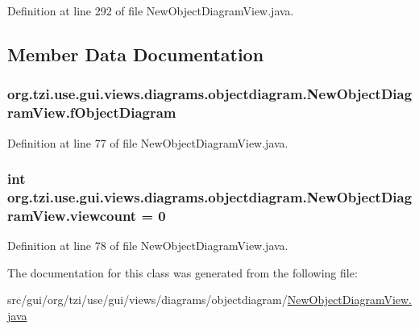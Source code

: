 Definition at line 292 of file New\-Object\-Diagram\-View.\-java.



\subsection{Member Data Documentation}
\hypertarget{classorg_1_1tzi_1_1use_1_1gui_1_1views_1_1diagrams_1_1objectdiagram_1_1_new_object_diagram_view_ad7a1ba78a6a7ca88f1766a8d6df07f90}{
\subsubsection[{f\-Object\-Diagram}]{ org.\-tzi.\-use.\-gui.\-views.\-diagrams.\-objectdiagram.\-New\-Object\-Diagram\-View.\-f\-Object\-Diagram\hspace{0.3cm}{\ttfamily [protected]}}}\label{classorg_1_1tzi_1_1use_1_1gui_1_1views_1_1diagrams_1_1objectdiagram_1_1_new_object_diagram_view_ad7a1ba78a6a7ca88f1766a8d6df07f90}


Definition at line 77 of file New\-Object\-Diagram\-View.\-java.

\hypertarget{classorg_1_1tzi_1_1use_1_1gui_1_1views_1_1diagrams_1_1objectdiagram_1_1_new_object_diagram_view_a11a470c191107c665d2382ba26a9cbb1}{
\subsubsection[{viewcount}]{\setlength{\rightskip}{0pt plus 5cm}int org.\-tzi.\-use.\-gui.\-views.\-diagrams.\-objectdiagram.\-New\-Object\-Diagram\-View.\-viewcount = 0\hspace{0.3cm}{\ttfamily [static]}}}\label{classorg_1_1tzi_1_1use_1_1gui_1_1views_1_1diagrams_1_1objectdiagram_1_1_new_object_diagram_view_a11a470c191107c665d2382ba26a9cbb1}


Definition at line 78 of file New\-Object\-Diagram\-View.\-java.



The documentation for this class was generated from the following file\-:\begin{DoxyCompactItemize}
\item 
src/gui/org/tzi/use/gui/views/diagrams/objectdiagram/\hyperlink{_new_object_diagram_view_8java}{New\-Object\-Diagram\-View.\-java}\end{DoxyCompactItemize}
